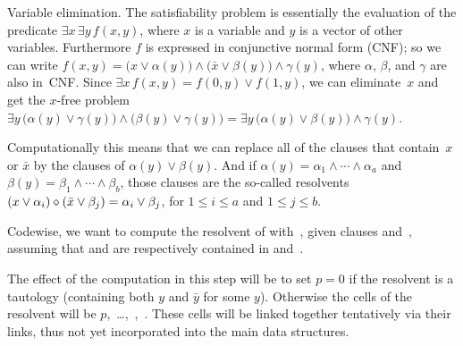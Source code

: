 Variable elimination. The satisfiability problem is
essentially the
evaluation of the predicate $\exists x\,\exists y\,f(x,y)$, where
$x$ is a variable and $y$ is a vector of other variables.
Furthermore $f$ is expressed in conjunctive normal form ({\mc CNF});
so we can write $f(x,y)=\bigl(x\lor\alpha(y)\bigr)\land
\bigl(\bar x\lor\beta(y)\bigr)\land\gamma(y)$, where $\alpha$, $\beta$,
and $\gamma$ are also in~{\mc CNF}. Since $\exists x\,f(x,y)=
f(0,y)\lor f(1,y)$, we can eliminate~$x$ and get the $x$-free problem
$\exists y\,\bigl(\alpha(y)\lor\gamma(y)\bigr)\land
\bigl(\beta (y)\lor\gamma(y)\bigr)=
\exists y\,\bigl(\alpha(y)\lor\beta(y)\bigr)\land\gamma(y)$.

Computationally this means that
we can replace all of the clauses that contain~$x$
or $\bar x$ by the clauses of $\alpha(y)\lor\beta(y)$. And if
$\alpha(y)=\alpha_1\land\cdots\land\alpha_a$ and
$\beta(y)=\beta_1\land\cdots\land\beta_b$, those clauses are the
so-called resolvents
$(x\lor\alpha_i)\diamond(\bar x\lor\beta_j)=\alpha_i\lor\beta_j$,
for $1\le i\le a$ and $1\le j\le b$.

Codewise, we want to compute the resolvent of  with~,
given clauses  and~, assuming that  and  are
respectively contained in  and~.

The effect of the computation in this step
will be to set $p=0$ if the resolvent is a
tautology (containing both $y$ and $\bar y$ for some $y$).
Otherwise the cells of the resolvent will be
$p$,~\dots,~,~. These cells
will be
linked together tentatively via their  links, thus not yet
incorporated
into the main data structures.

